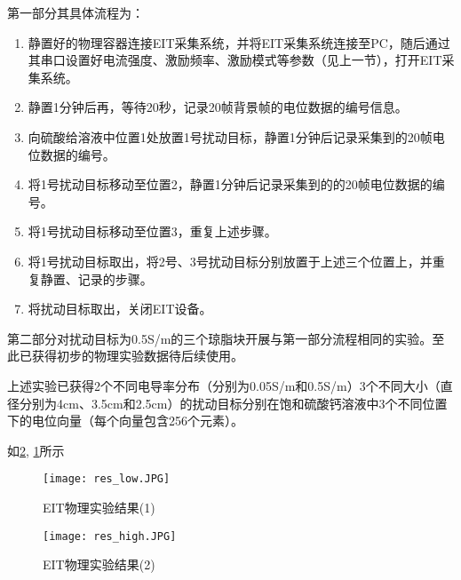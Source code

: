 第一部分其具体流程为：
\begin{enumerate}
    \item 静置好的物理容器连接EIT采集系统，并将EIT采集系统连接至PC，随后通过其串口设置好电流强度、激励频率、激励模式等参数（见上一节），打开EIT采集系统。
    \item 静置1分钟后再，等待20秒，记录20帧背景帧的电位数据的编号信息。
    \item 向硫酸给溶液中位置1处放置1号扰动目标，静置1分钟后记录采集到的20帧电位数据的编号。
    \item 将1号扰动目标移动至位置2，静置1分钟后记录采集到的的20帧电位数据的编号。
    \item 将1号扰动目标移动至位置3，重复上述步骤。
    \item 将1号扰动目标取出，将2号、3号扰动目标分别放置于上述三个位置上，并重复静置、记录的步骤。
    \item 将扰动目标取出，关闭EIT设备。
\end{enumerate}

第二部分对扰动目标为0.5S/m的三个琼脂块开展与第一部分流程相同的实验。至此已获得初步的物理实验数据待后续使用。

上述实验已获得2个不同电导率分布（分别为0.05S/m和0.5S/m）3个不同大小（直径分别为4cm、3.5cm和2.5cm）的扰动目标分别在饱和硫酸钙溶液中3个不同位置下的电位向量（每个向量包含256个元素）。

如\cref{figure:res_high}, \cref{figure:res_low}所示
\begin{figure}[h]
    \centering
    \texttt{[image: res\_low.JPG]}
    \caption{EIT物理实验结果(1)}
    \label{figure:res_low}
\end{figure}

\begin{figure}[h]
    \centering
    \texttt{[image: res\_high.JPG]}
    \caption{EIT物理实验结果(2)}
    \label{figure:res_high}
\end{figure}

